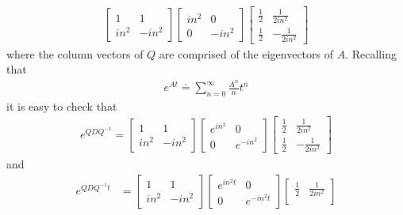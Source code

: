 \documentclass[12pt,reqno]{amsart}
\numberwithin{equation}{section}  %
\begin{document}
\begin{appendices}
\begin{equation*}
\begin{split}
\begin{bmatrix}
  1 & 1
  \\
  in^{2} & -in^{2}
  \end{bmatrix}
  \begin{bmatrix}
    in^{2} & 0 
    \\
    0 & -in^{2}
  \end{bmatrix}
  \begin{bmatrix}
    \frac{1}{2} & \frac{1}{2i n^{2}} \\
    \frac{1}{2} & -\frac{1}{2i n^{2}}
  \end{bmatrix}
\end{split}
\end{equation*}
%
%
where the column vectors of $Q$ are comprised of the eigenvectors of $A$.
Recalling that 
%
%
\begin{equation*}
\begin{split}
  e^{At} \doteq \sum_{n=0}^{\infty} \frac{A^{n}}{n}t^{n}
\end{split}
\end{equation*}
%
%
it is easy to check that 
%
%
\begin{equation*}
\begin{split}
  e^{Q D Q^{-1}} = 
\begin{bmatrix}
  1 & 1
  \\
  in^{2} & -in^{2}
  \end{bmatrix}
  \begin{bmatrix}
    e^{in^{2}} & 0 
    \\
    0 & e^{-in^{2}}
  \end{bmatrix}
  \begin{bmatrix}
    \frac{1}{2} & \frac{1}{2i n^{2}} \\
    \frac{1}{2} & -\frac{1}{2i n^{2}}
  \end{bmatrix}
\end{split}
\end{equation*}
%
%
and 
\begin{equation}
  \label{matrix-expo}
\begin{split}
  e^{Q D Q^{-1}t}
  & = 
\begin{bmatrix}
  1 & 1
  \\
  in^{2} & -in^{2}
  \end{bmatrix}
  \begin{bmatrix}
    e^{in^{2}t} & 0 
    \\
    0 & e^{-in^{2}t}
  \end{bmatrix}
\begin{bmatrix}
    \frac{1}{2} & \frac{1}{2i n^{2}} \\

\end{bmatrix}
\end{split}
\end{equation}
\end{appendices}
\end{document}
